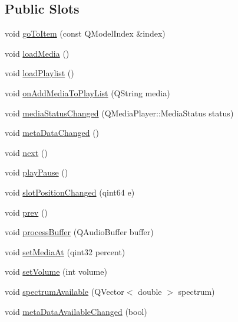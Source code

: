 \subsection*{Public Slots}
\begin{DoxyCompactItemize}
\item 
void \hyperlink{class_main_window_a32e621ebdb3ef2d76bd607af16e8d0d0}{go\-To\-Item} (const Q\-Model\-Index \&index)
\item 
void \hyperlink{class_main_window_a5dc0f9a967ac6c534cfbf6e517275ba9}{load\-Media} ()
\item 
void \hyperlink{class_main_window_ac877ae03abf6415808e0bb36ff71e5be}{load\-Playlist} ()
\item 
void \hyperlink{class_main_window_a8bb0a943725aa0d7959a8a93da3194fc}{on\-Add\-Media\-To\-Play\-List} (Q\-String media)
\item 
void \hyperlink{class_main_window_a2758962312cc237231c349b21603d9fe}{media\-Status\-Changed} (Q\-Media\-Player\-::\-Media\-Status status)
\item 
void \hyperlink{class_main_window_aa4ec6868c3ee50f63ffe4803a7136ae6}{meta\-Data\-Changed} ()
\item 
void \hyperlink{class_main_window_aabed273350d064a3a8d73afb01848fea}{next} ()
\item 
void \hyperlink{class_main_window_a6e12ed66de9615bf272f92a47cd5e6c8}{play\-Pause} ()
\item 
void \hyperlink{class_main_window_a44f59c80c2093aaaca31cfc82def698f}{slot\-Position\-Changed} (qint64 e)
\item 
void \hyperlink{class_main_window_a56270e72e4ec5e058a040657932069cf}{prev} ()
\item 
void \hyperlink{class_main_window_a5c459d00d64786ef93db7670034af47d}{process\-Buffer} (Q\-Audio\-Buffer buffer)
\item 
void \hyperlink{class_main_window_aedb83314811efab4ea67c69cbce29aea}{set\-Media\-At} (qint32 percent)
\item 
void \hyperlink{class_main_window_aeb9309a7fe8efd574fe5b7ac92ba2a92}{set\-Volume} (int volume)
\item 
void \hyperlink{class_main_window_a9efd699e3eaed3396733475499297bc0}{spectrum\-Available} (Q\-Vector$<$ double $>$ spectrum)
\item 
void \hyperlink{class_main_window_ac7664400c470d7312a62ec8f4f7822a6}{meta\-Data\-Available\-Changed} (bool)
\end{DoxyCompactItemize}
